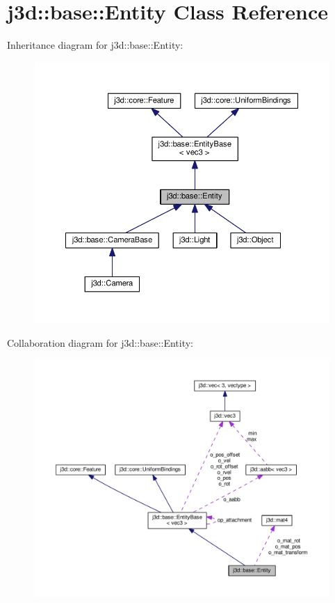 \hypertarget{classj3d_1_1base_1_1Entity}{}\section{j3d\+:\+:base\+:\+:Entity Class Reference}
\label{classj3d_1_1base_1_1Entity}


Inheritance diagram for j3d\+:\+:base\+:\+:Entity\+:
\nopagebreak
\begin{figure}[H]
\begin{center}
\leavevmode
\includegraphics[width=350pt]{classj3d_1_1base_1_1Entity__inherit__graph}
\end{center}
\end{figure}


Collaboration diagram for j3d\+:\+:base\+:\+:Entity\+:
\nopagebreak
\begin{figure}[H]
\begin{center}
\leavevmode
\includegraphics[width=350pt]{classj3d_1_1base_1_1Entity__coll__graph}
\end{center}
\end{figure}
